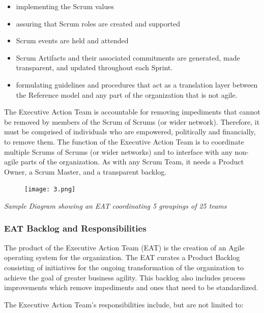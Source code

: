 \documentclass[12pt,a4paper,parskip=full]{scrartcl}
\begin{document}
\begin{itemize}
\itemsep1pt\parskip0pt
\item
  implementing the Scrum values
\item
  assuring that Scrum roles are created and supported
\item
  Scrum events are held and attended
\item
 Scrum Artifacts and their associated commitments are generated, made transparent, and updated throughout each Sprint.
\item
 formulating guidelines and procedures that act as a translation layer between the Reference model and any part of the organization that is not agile.
\end{itemize}

The Executive Action Team is accountable for removing impediments that cannot be removed by members of the Scrum of Scrums (or wider network). Therefore, it must be comprised of individuals who are empowered, politically and financially, to remove them. The function of the Executive Action Team is to coordinate multiple Scrums of Scrums (or wider networks) and to interface with any non-agile parts of the organization. As with any Scrum Team, it needs a Product Owner, a Scrum Master, and a transparent backlog.

\begin{figure}[H]
    \centering
    \texttt{[image: 3.png]}
    
\end{figure}


\emph{Sample Diagram showing an EAT coordinating 5 groupings of 25
teams}

\subsubsection{EAT Backlog and
Responsibilities}\label{EAT-backlog-and-responsibilities}

The product of the Executive Action Team (EAT) is the creation of an Agile operating system for the organization. The EAT curates a Product Backlog consisting of initiatives for the ongoing transformation of the organization to achieve the goal of greater business agility. This backlog also includes process improvements which remove impediments and ones that need to be standardized.

The Executive Action Team's responsibilities include, but are not
limited to:
\end{document}
